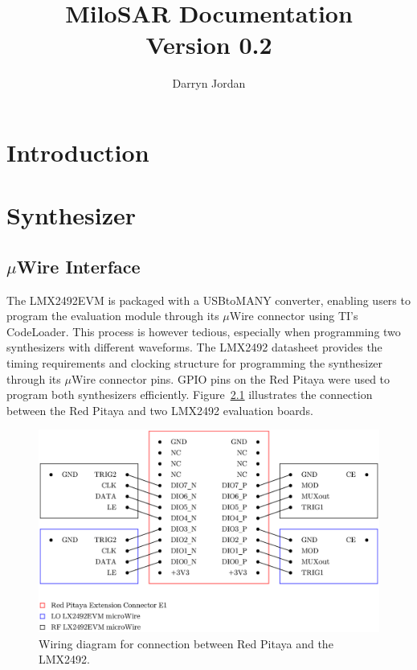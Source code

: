 \documentclass[a4paper,11pt]{report}
\title{MiloSAR Documentation \\ \vspace{0.5cm} \Large Version 0.2}
\author{Darryn Jordan}
\begin{document}
\maketitle
\tableofcontents

\chapter{Introduction}

\chapter{Synthesizer}

\section{$ \mu $Wire Interface}

The LMX2492EVM is packaged with a USBtoMANY converter, enabling users to program the evaluation module through its $ \mu $Wire connector using TI's CodeLoader. This process is however tedious, especially when programming two synthesizers with different waveforms. The LMX2492 datasheet provides the timing requirements and clocking structure for programming the synthesizer through its $ \mu $Wire connector pins. GPIO pins on the Red Pitaya were used to program both synthesizers efficiently. Figure~\ref{fig:rp_synth_connect} illustrates the connection between the Red Pitaya and two LMX2492 evaluation boards.
\begin{figure}[h!]
    \begin{center}
        \includegraphics[width=\textwidth]{images/rp_synth_connections.pdf}
        \caption{Wiring diagram for connection between Red Pitaya and the LMX2492.}
        \label{fig:rp_synth_connect}
    \end{center}
\end{figure}
\end{document}
